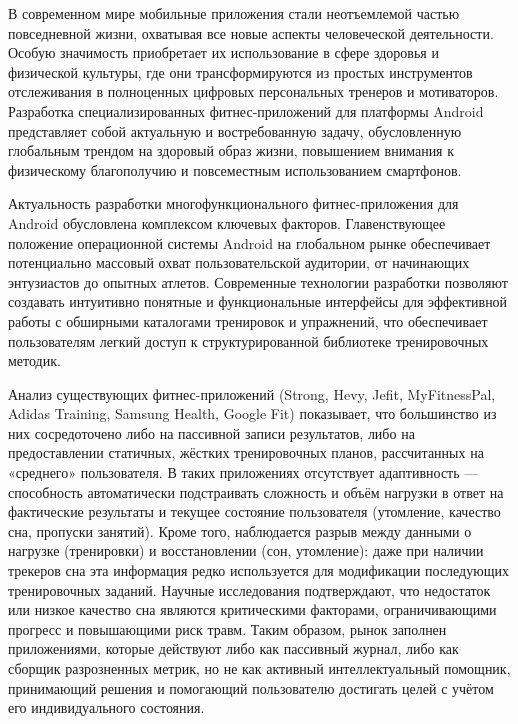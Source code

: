
В современном мире мобильные приложения стали неотъемлемой частью повседневной жизни, охватывая все новые аспекты человеческой деятельности. Особую значимость приобретает их использование в сфере здоровья и физической культуры, где они трансформируются из простых инструментов отслеживания в полноценных цифровых персональных тренеров и мотиваторов. Разработка специализированных фитнес-приложений для платформы Android представляет собой актуальную и востребованную задачу, обусловленную глобальным трендом на здоровый образ жизни, повышением внимания к физическому благополучию и повсеместным использованием смартфонов.

Актуальность разработки многофункционального фитнес-приложения для Android обусловлена комплексом ключевых факторов. Главенствующее положение операционной системы Android на глобальном рынке обеспечивает потенциально массовый охват пользовательской аудитории, от начинающих энтузиастов до опытных атлетов. Современные технологии разработки позволяют создавать интуитивно понятные и функциональные интерфейсы для эффективной работы с обширными каталогами тренировок и упражнений, что обеспечивает пользователям легкий доступ к структурированной библиотеке тренировочных методик.

Анализ существующих фитнес-приложений (Strong, Hevy, Jefit, MyFitnessPal, Adidas Training, Samsung Health, Google Fit) показывает, что большинство из них сосредоточено либо на пассивной записи результатов, либо на предоставлении статичных, жёстких тренировочных планов, рассчитанных на «среднего» пользователя. В таких приложениях отсутствует адаптивность — способность автоматически подстраивать сложность и объём нагрузки в ответ на фактические результаты и текущее состояние пользователя (утомление, качество сна, пропуски занятий). Кроме того, наблюдается разрыв между данными о нагрузке (тренировки) и восстановлении (сон, утомление): даже при наличии трекеров сна эта информация редко используется для модификации последующих тренировочных заданий. Научные исследования подтверждают, что недостаток или низкое качество сна являются критическими факторами, ограничивающими прогресс и повышающими риск травм. Таким образом, рынок заполнен приложениями, которые действуют либо как пассивный журнал, либо как сборщик разрозненных метрик, но не как активный интеллектуальный помощник, принимающий решения и помогающий пользователю достигать целей с учётом его индивидуального состояния.

